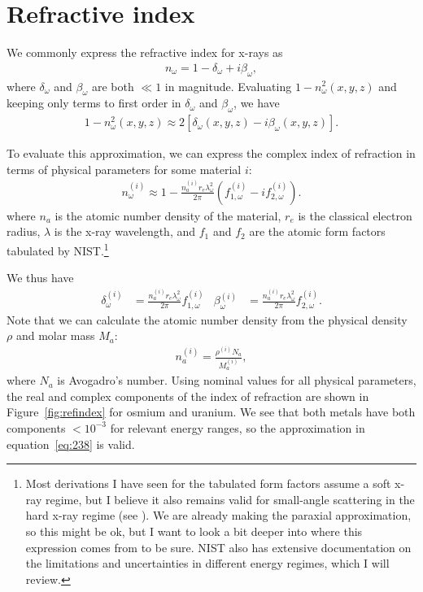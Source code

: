\documentclass{article}
\begin{document}
\appendix
\section{Refractive index}\label{refractindex}
We commonly express the refractive index for x-rays as
\begin{align}
  n_{\omega} = 1 - \delta_{\omega} + i\beta_{\omega},
\end{align}
where $\delta_{\omega}$ and $\beta_{\omega}$ are both $\ll 1$ in
magnitude. Evaluating $1 - n_{\omega}^2(x,y,z)$ and keeping only terms to first
order in $\delta_{\omega}$ and $\beta_{\omega}$, we have
\begin{align}
  1 - n_{\omega}^2(x,y,z) \approx 2\left[\delta_{\omega}(x,y,z) - i\beta_{\omega}(x,y,z)\right].
  \label{eq:238}
\end{align}

To evaluate this approximation, we can express the complex index of refraction
in terms of physical parameters for some material $i$:
\begin{align}
  n^{(i)}_{\omega} \approx 1 - \frac{n_a^{(i)} r_e \lambda_{\omega}^2}{2\pi}\left(f_{1,\omega}^{(i)} - if_{2,\omega}^{(i)}\right).
\end{align}
where $n_a$ is the atomic number density of the material, $r_e$ is the classical
electron radius, $\lambda$ is the x-ray wavelength, and $f_1$ and $f_2$ are the
atomic form factors tabulated by NIST.\footnote{Most derivations I have seen for
  the tabulated form factors assume a soft x-ray regime, but I believe it also
  remains valid for small-angle scattering in the hard x-ray regime (see
  \cite{Kirz1995}). We are already making the paraxial approximation, so this
  might be ok, but I want to look a bit deeper into where this expression comes
  from to be sure. NIST also has extensive documentation on the limitations and
  uncertainties in different energy regimes, which I will review.}

We thus have
\begin{align}
  \delta_{\omega}^{(i)} &= \frac{n_a^{(i)}r_e\lambda_{\omega}^2}{2\pi}f_{1,\omega}^{(i)} & \beta_{\omega}^{(i)} &= \frac{n_a^{(i)}r_e\lambda_{\omega}^2}{2\pi}f_{2,\omega}^{(i)}.
\end{align}
Note that we can calculate the atomic number density from the physical density
$\rho$ and molar mass $M_a$:
\begin{align}
  n_a^{(i)} = \frac{\rho^{(i)}N_a}{M_a^{(i)}},
\end{align}
where $N_a$ is Avogadro's number. Using nominal values for all physical
parameters, the real and complex components of the index of refraction are shown
in Figure~\ref{fig:refindex} for osmium and uranium. We see that both metals
have both components $<10^{-3}$ for relevant energy ranges, so the approximation
in equation~\ref{eq:238} is valid.
\end{document}
